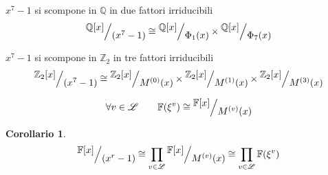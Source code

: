 \documentclass[mathserif]{beamer}
\def\quotient#1#2{%
   \raise1ex\hbox{$#1$}\Big/\lower1ex\hbox{$#2$}%
}
\newtheorem{corollario}{Corollario}
\begin{document}
\thispagestyle{empty}
\begin{frame}
   \vspace{-1.5cm}
        \begin{center}
         $x^7 - 1$ si scompone in $ \mathbb{Q} $ in due fattori irriducibili 
	\begin{align*}
	  \quotient{\mathbb{Q} \lbrack x \rbrack  }{(x^{7} - 1)}
	  \cong
	  \quotient{\mathbb{Q} \lbrack x \rbrack  }{\Phi_{1}(x)}
	  \times
	  \quotient{\mathbb{Q} \lbrack x \rbrack  }{\Phi_{7}(x)}
	\end{align*}
	\vspace{1cm}
	
	 $x^7 - 1$ si scompone in $ \mathbb{Z}_{2}$ in tre fattori irriducibili
	\begin{align*}
	  \quotient{\mathbb{Z}_{2} \lbrack x \rbrack  }{(x^{7} - 1)}
	  \cong
	  \quotient{\mathbb{Z}_{2} \lbrack x \rbrack  }{M^{(0)}(x)}
	  \times
	  \quotient{\mathbb{Z}_{2} \lbrack x \rbrack  }{M^{(1)}(x)}
	  \times
	  \quotient{\mathbb{Z}_{2} \lbrack x \rbrack  }{M^{(3)}(x)}
	\end{align*}
	\end{center}
\end{frame}

\begin{frame}
   \begin{lemma}
   \begin{align*}
      \forall v \in \mathscr{L}
      \qquad
      \mathbb{F}(\xi^{v})
      \cong
      \quotient{\mathbb{F} \lbrack x \rbrack  }{M^{(v)}(x)}
   \end{align*}
  \end{lemma}
  \begin{corollario}
     \begin{align*}
        \quotient{\mathbb{F} \lbrack x \rbrack  }{ (x^{r} - 1)} 
         \cong 
         \prod_{v\in \mathscr{L}} \quotient{\mathbb{F} \lbrack x \rbrack  }{M^{(v)}(x)}  
         \cong 
         \prod_{v\in \mathscr{L}} \mathbb{F}(\xi^{v})
     \end{align*}   
  \end{corollario}
   
\end{frame}
\end{document}
